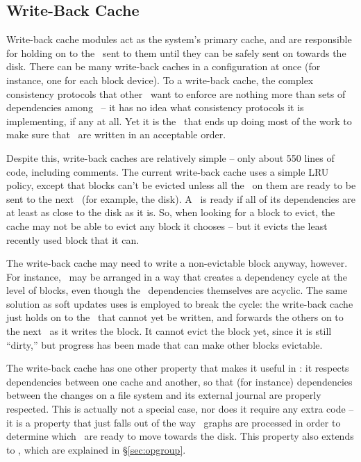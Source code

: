 \subsection{Write-Back Cache}
\label{sec:modules:wbcache}

Write-back cache modules act as the system's primary cache, and are
responsible for holding on to the \chdescs\ sent to them until they can be
safely sent on towards the disk.
%
%
There can be many write-back caches in a configuration at once (for
instance, one for each block device).
%
%
To a write-back cache, the complex consistency protocols that
other \modules\ want to enforce are nothing more than sets of dependencies among
\chdescs\ -- it has no idea what consistency protocols it is implementing, if
any at all.
%
Yet it is the \module\ that ends up doing most of the work to make
sure that \chdescs\ are written in an acceptable order.

Despite this, write-back caches are relatively simple
-- only about 550 lines of code, including
comments. The current write-back cache uses a simple LRU policy, except that
blocks can't be evicted unless all the \chdescs\ on them are
ready to be sent to the next \module\ (for example, the disk). A \chdesc\ is
ready if all of its dependencies are at least as close to the disk as it is. So,
when looking for a block to evict, the cache may not be able to evict any block
it chooses -- but it evicts the least recently used block that it can.

The write-back cache may need to write a non-evictable block anyway, however.
For instance, \chdescs\ may be arranged in a way that creates a dependency cycle
at the level of blocks, even though the \chdesc\ dependencies themselves are
acyclic. The same solution as soft updates uses is employed to break the cycle:
the write-back cache just holds on to the \chdescs\ that cannot yet be written,
and forwards the others on to the next \module\ as it writes the block. It
cannot evict the block yet, since it is still ``dirty,'' but progress has been
made that can make other blocks evictable.

The write-back cache has one other property that makes it useful in \Kudos: it
respects dependencies between one cache and another, so that (for instance)
dependencies between the changes on a file system and its external journal are
properly respected. This is actually not a special case, nor does it require any
extra code -- it is a property that just falls out of the way \chdesc\ graphs
are processed in order to determine which \chdescs\ are ready to move towards
the disk. This property also extends to \opgroups, which
are explained in \S\ref{sec:opgroup}.

